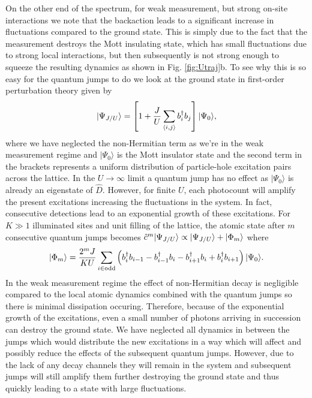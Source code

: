 On the other end of the spectrum, for weak measurement, but strong
on-site interactions we note that the backaction leads to a
significant increase in fluctuations compared to the ground
state. This is simply due to the fact that the measurement destroys
the Mott insulating state, which has small fluctuations due to strong
local interactions, but then subsequently is not strong enough to
squeeze the resulting dynamics as shown in Fig. \ref{fig:Utraj}b. To
see why this is so easy for the quantum jumps to do we look at the
ground state in first-order perturbation theory given by
\begin{equation}
  | \Psi_{J/U} \rangle = \left[ 1 + \frac{J}{U} \sum_{\langle i, j
      \rangle} b^\dagger_i b_j \right] | \Psi_0 \rangle,
\end{equation}
where we have neglected the non-Hermitian term as we're in the weak
measurement regime and $| \Psi_0 \rangle$ is the Mott insulator state and the second
term in the brackets represents a uniform distribution of
particle-hole excitation pairs across the lattice. In the
$U \rightarrow \infty$ limit a quantum jump has no effect as
$| \Psi_0 \rangle$ is already an eigenstate of $\hat{D}$. However, for
finite $U$, each photocount will amplify the present excitations
increasing the fluctuations in the system. In fact, consecutive
detections lead to an exponential growth of these excitations. For
$K \gg 1$ illuminated sites and unit filling of the lattice, the
atomic state after $m$ consecutive quantum jumps becomes
$\hat{c}^m | \Psi_{J/U} \rangle \propto | \Psi_{J/U} \rangle + | \Phi_m
\rangle$ where
\begin{equation}
  | \Phi_m \rangle = \frac{2^m J} {K U} \sum_{i \in
    \mathrm{odd}} \left( b^\dagger_i b_{i-1} - b^\dagger_{i-1} b_i - b^\dagger_{i+1} b_i
    + b^\dagger_i b_{i+1} \right) | \Psi_0 \rangle.
\end{equation}
In the weak measurement regime the effect of non-Hermitian decay is
negligible compared to the local atomic dynamics combined with the
quantum jumps so there is minimal dissipation occuring. Therefore,
because of the exponential growth of the excitations, even a small
number of photons arriving in succession can destroy the ground
state. We have neglected all dynamics in between the jumps which would
distribute the new excitations in a way which will affect and possibly
reduce the effects of the subsequent quantum jumps. However, due to
the lack of any decay channels they will remain in the system and
subsequent jumps will still amplify them further destroying the ground
state and thus quickly leading to a state with large fluctuations.


